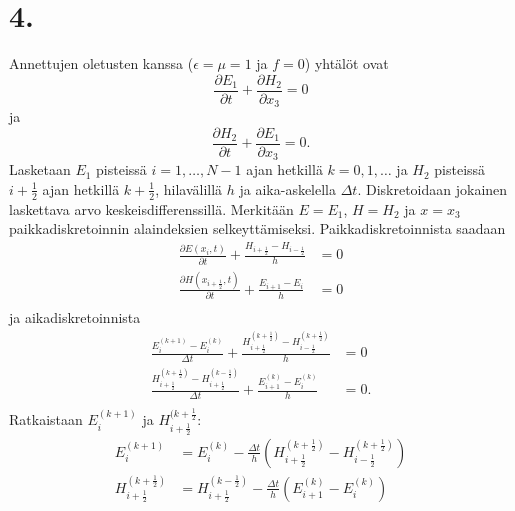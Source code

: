 \documentclass{article}
\begin{document}
\newpage
\section*{4.}

Annettujen oletusten kanssa ($\epsilon = \mu = 1$ ja $f = 0$) yhtälöt ovat
\[
  \frac{\partial E_1}{\partial t} + \frac{\partial H_2}{\partial x_3} = 0
\]
ja
\[
  \frac{\partial H_2}{\partial t} + \frac{\partial E_1}{\partial x_3} = 0.
\]
Lasketaan $E_1$ pisteissä $i = 1,\dots,N-1$ ajan hetkillä $k = 0,1,\dots$ ja $H_2$
pisteissä $i + \frac{1}{2}$ ajan hetkillä $k + \frac{1}{2}$, hilavälillä $h$ ja
aika-askelella $\Delta t$.  Diskretoidaan jokainen laskettava arvo
keskeisdifferenssillä. Merkitään $E = E_1$, $H = H_2$ ja $x = x_3$
paikkadiskretoinnin alaindeksien selkeyttämiseksi. Paikkadiskretoinnista
saadaan
\begin{align*}
  \frac{\partial E(x_i,t)}{\partial t} + \frac{H_{i+\frac{1}{2}} - H_{i-\frac{1}{2}}}{h} &= 0 \\
  \frac{\partial H(x_{i+\frac{1}{2}},t)}{\partial t} + \frac{E_{i+1} - E_i}{h} &= 0 \\
\end{align*}
ja aikadiskretoinnista
\begin{align*}
  \frac{E_i^{(k+1)} - E_i^{(k)}}{\Delta t}
  + \frac{H_{i+\frac{1}{2}}^{(k+\frac{1}{2})} - H_{i-\frac{1}{2}}^{(k+\frac{1}{2})}}{h} &= 0 \\
  \frac{H_{i+\frac{1}{2}}^{(k+\frac{1}{2})} - H_{i+\frac{1}{2}}^{(k-\frac{1}{2})}}{\Delta t}
  + \frac{E_{i+1}^{(k)} - E_i^{(k)}}{h} &= 0. \\
\end{align*}
Ratkaistaan $E_i^{(k+1)}$ ja $H_{i+\frac{1}{2}}^{(k+\frac{1}{2}}$:
\begin{align*}
  E_i^{(k+1)} &= E_i^{(k)} - \frac{\Delta t}{h}(
    H_{i+\frac{1}{2}}^{(k+\frac{1}{2})} - H_{i-\frac{1}{2}}^{(k+\frac{1}{2})}) \\
  H_{i+\frac{1}{2}}^{(k+\frac{1}{2})} &= H_{i+\frac{1}{2}}^{(k-\frac{1}{2})}
  - \frac{\Delta t}{h} (E_{i+1}^{(k)} - E_i^{(k)}) \\
\end{align*}
\end{document}
